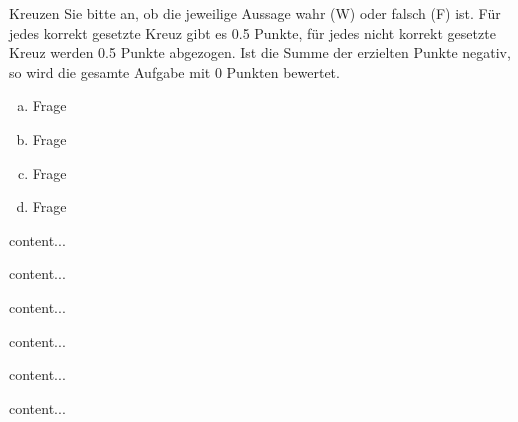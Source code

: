 \documentclass[12pt]{article}
\begin{document}
\begin{aufgabe}[8 Punkte]
    Kreuzen Sie bitte an, ob die jeweilige Aussage wahr (W) oder falsch (F) ist. F\"ur jedes
    korrekt gesetzte Kreuz gibt es 0.5 Punkte, f\"ur jedes nicht korrekt gesetzte Kreuz werden 0.5 Punkte
    abgezogen. Ist die Summe der erzielten Punkte negativ, so wird die gesamte Aufgabe mit
    0 Punkten bewertet.
    \begin{enumerate}[a)]
        \item Frage

        \begin{ankreuzblock}
        \end{ankreuzblock}
        \item Frage

        \begin{ankreuzblock}
        \end{ankreuzblock}
        \item Frage

        \begin{ankreuzblock}
        \end{ankreuzblock}
        \item Frage

        \begin{ankreuzblock}
        \end{ankreuzblock}
    \end{enumerate}
\end{aufgabe}
%
%
%
%
\newpage
%
\begin{aufgabe}[11 Punkte]
    content...
\end{aufgabe}
%
\begin{loesung}
    content...
\end{loesung}
%
%
%
%
\begin{aufgabe}[11 Punkte]
    content...
\end{aufgabe}
%
\begin{loesung}
    content...
\end{loesung}
%
%
%
%
\begin{aufgabe}[12 Punkte]
    content...
\end{aufgabe}
%
\begin{loesung}
    content...
\end{loesung}
%
%
%
%
\end{document}

